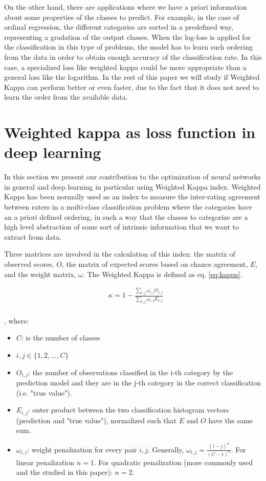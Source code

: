 \documentclass[times,twocolumn,final,authoryear]{elsarticle}
\begin{document}
On the other hand, there are applications where we have a priori information about some properties of the classes to predict. For example, in the case of ordinal regression, the different categories are sorted in a predefined way, representing a gradation of the output classes. When the log-loss is applied for the classification in this type of problems, the model has to learn such ordering from the data in order to obtain enough accuracy of the classification rate. In this case, a specialized loss like weighted kappa could be more appropriate than a general loss like the logarithm. In the rest of this paper we will study if Weighted Kappa can perform better or even faster, due to the fact that it does not need to learn the order from the available data. 

\section{Weighted kappa as loss function in deep learning}

In this section we present our contribution to the optimization of neural networks in general and deep learning in particular using Weighted Kappa index. Weighted Kappa has been normally used as an index to measure the inter-rating agreement between raters in a multi-class classification problem where the categories have an a priori defined ordering, in such a way that the classes to categorize are a high level abstraction of some sort of intrinsic information that we want to extract from data.

Three matrices are involved in the calculation of this index: the matrix of observed scores, $O$, the matrix of expected scores based on chance agreement, $E$, and the weight matrix, $\omega$. The Weighted Kappa is defined as eq. \ref{eq:kappa}.


\begin{equation}
\label{eq:kappa}
\begin{aligned}
&\kappa = 1 - \frac{ \sum_{i,j} \omega_{i,j} O_{i,j} }
{\sum_{i,j} \omega_{i,j} E_{i,j}}\\
\end{aligned}
\end{equation}

, where:
\begin{itemize}
	\item[] $C$: is the number of classes
    \item[] $i, j \in \{ 1, 2, ..., C\}$
	\item[] $O_{i,j}$: the number of observations classified in the i-th category by the prediction model and they are in the j-th category in the correct classification (i.e. "true value").
	\item[] $E_{i,j}$: outer product between the two classification histogram vectors (prediction and "true value"), normalized such that $E$ and $O$ have the same sum.
	\item[] $\omega_{i,j}$: weight penalization for every pair $i,j$. Generally, $\omega_{i,j} = \frac{(i-j)^n}{(C - 1)^n}$. For linear penalization $n = 1$. For quadratic penalization (more commonly used and the studied in this paper): $n = 2$.
\end{itemize}
\end{document}
